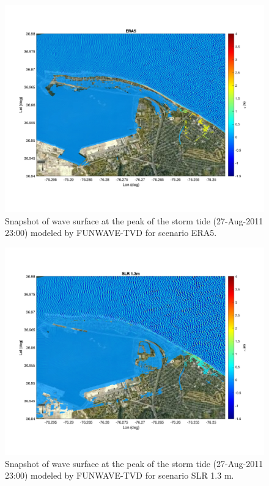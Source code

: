 \documentclass[preprint,12pt,authoryear] {elsarticle}
\begin{document}

\begin{figure}
\centering
\includegraphics[width=\textwidth]{./figures/funwave_ERA5_eta.jpg}
\caption{Snapshot of wave surface at the peak of the storm tide (27-Aug-2011 23:00) modeled by FUNWAVE-TVD for scenario ERA5. }
\label{funwave_ERA5_eta}
\centering
\end{figure}

\begin{figure}
\centering
\includegraphics[width=\textwidth]{./figures/funwave_SLR _eta.jpg}
\caption{Snapshot of wave surface at the peak of the storm tide (27-Aug-2011 23:00) modeled by FUNWAVE-TVD for scenario SLR 1.3 m. }
\label{funwave_SLR_eta}
\centering
\end{figure}
\end{document}
